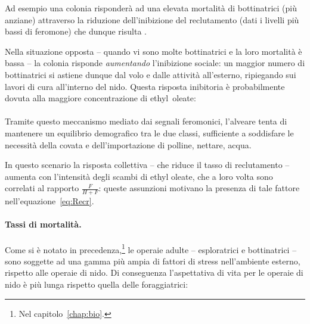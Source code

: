 Ad esempio una colonia risponderà ad una elevata mortalità di bottinatrici (più anziane) attraverso
la riduzione dell'inibizione del reclutamento (dati i livelli più bassi di feromone) che dunque risulta
.

Nella situazione opposta -- \ie quando vi sono molte bottinatrici e la loro mortalità è bassa -- la colonia
risponde \emph{aumentando} l'inibizione sociale: un maggior numero di bottinatrici si astiene dunque dal volo e
dalle attività all'esterno, ripiegando sui lavori di cura all'interno del nido. Questa risposta inibitoria
è probabilmente dovuta alla maggiore concentrazione di ethyl~oleate:

\paragraph{}
Tramite questo meccanismo mediato dai segnali feromonici, l'alveare tenta di mantenere un equilibrio
demografico tra le due classi, sufficiente a soddisfare le necessità della covata e dell'importazione
di polline, nettare, acqua.

In questo scenario la risposta collettiva -- che riduce il tasso di reclutamento -- aumenta con
l'intensità degli scambi di ethyl oleate, che a loro volta sono correlati al rapporto $\frac{F}{H+F}$:
queste assunzioni motivano la presenza di tale fattore nell'equazione~\eqref{eq:Recr}.


\paragraph{Tassi di mortalità.}
Come si è notato in precedenza,\footnote{Nel capitolo~\ref{chap:bio}.}
le operaie adulte -- esploratrici e bottinatrici -- sono soggette ad una gamma più ampia di fattori di stress
nell'ambiente esterno, rispetto alle operaie di nido. Di conseguenza l'aspettativa di vita per le operaie di
nido è più lunga rispetto quella delle foraggiatrici:

